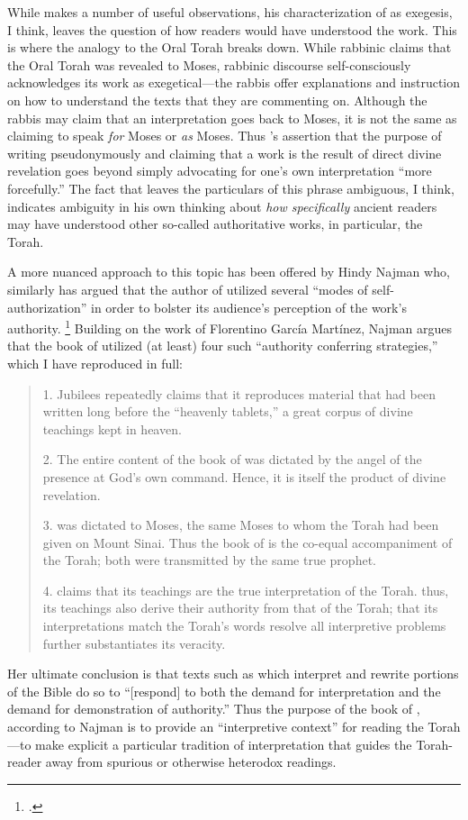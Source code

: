 While \vanderkam makes a number of useful observations, his characterization of \jub as exegesis, I think, leaves the question of how readers would have understood the work. This is where the analogy to the Oral Torah breaks down. While rabbinic claims that the Oral Torah was revealed to Moses, rabbinic discourse self-consciously acknowledges its work as exegetical---the rabbis offer explanations and instruction on how to understand the texts that they are commenting on. Although the rabbis may claim that an interpretation goes back to Moses, it is not the same as claiming to speak \emph{for} Moses or \emph{as} Moses. Thus \vanderkam's assertion that the purpose of writing pseudonymously and claiming that a work is the result of direct divine revelation goes beyond simply advocating for one's own interpretation ``more forcefully.'' The fact that \vanderkam leaves the particulars of this phrase ambiguous, I think, indicates ambiguity in his own thinking about \emph{how specifically} ancient readers may have understood \jub \visavis other so-called authoritative works, in particular, the Torah.

A more nuanced approach to this topic has been offered by Hindy Najman who, similarly has argued that the author of \jub utilized several ``modes of self-authorization'' in order to bolster its audience's perception of the work's authority.%
    \footnote{\cite[380]{najman_jsj1999}.}
Building on the work of Florentino García Martínez,\autocite{martinez_najman-tigchelaar2012} Najman argues that the book of \jub utilized (at least) four such ``authority conferring strategies,'' which I have reproduced in full:
    \begin{quote}
        1. Jubilees repeatedly claims that it reproduces material that had been written long before the ``heavenly tablets,'' a great corpus of divine teachings kept in heaven.

        2. The entire content of the book of \jub was dictated by the angel of the presence at God's own command. Hence, it is itself the product of divine revelation.

        3. \jub was dictated to Moses, the same Moses to whom the Torah had been given on Mount Sinai. Thus the book of \jub is the co-equal accompaniment of the Torah; both were transmitted by the same true prophet.

        4. \jub claims that its teachings are the true interpretation of the Torah. thus, its teachings also derive their authority from that of the Torah; that its interpretations match the Torah's words resolve all interpretive problems further substantiates its veracity.%
        \autocite[380]{najman_jsj1999}
    \end{quote}
\noindent
Her ultimate conclusion is that texts such as \jub which interpret and rewrite portions of the Bible do so to ``[respond] to both the demand for interpretation and the demand for demonstration of authority.''\autocite[408]{najman_jsj1999} Thus the purpose of the book of \jub, according to Najman is to provide an ``interpretive context'' for reading the Torah---to make explicit a particular tradition of interpretation that guides the Torah-reader away from spurious or otherwise heterodox readings. 

